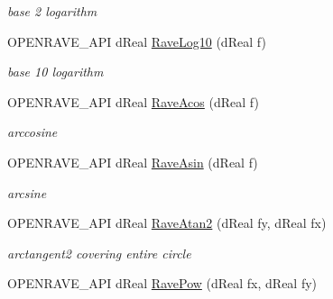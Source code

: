 \begin{DoxyCompactItemize}
\begin{DoxyCompactList}\small\item\em base 2 logarithm \item\end{DoxyCompactList}\item 
\hypertarget{group__affine__math_gab7abc4771e520f8baa20554f4c6d12c2}{
OPENRAVE\_\-API dReal \hyperlink{group__affine__math_gab7abc4771e520f8baa20554f4c6d12c2}{RaveLog10} (dReal f)}
\label{group__affine__math_gab7abc4771e520f8baa20554f4c6d12c2}

\begin{DoxyCompactList}\small\item\em base 10 logarithm \item\end{DoxyCompactList}\item 
\hypertarget{group__affine__math_ga97b4b78434f3e9b0b57cbd9d7b4b6610}{
OPENRAVE\_\-API dReal \hyperlink{group__affine__math_ga97b4b78434f3e9b0b57cbd9d7b4b6610}{RaveAcos} (dReal f)}
\label{group__affine__math_ga97b4b78434f3e9b0b57cbd9d7b4b6610}

\begin{DoxyCompactList}\small\item\em arccosine \item\end{DoxyCompactList}\item 
\hypertarget{group__affine__math_gabae52eb1a8ad7fc3bc90da48a4718941}{
OPENRAVE\_\-API dReal \hyperlink{group__affine__math_gabae52eb1a8ad7fc3bc90da48a4718941}{RaveAsin} (dReal f)}
\label{group__affine__math_gabae52eb1a8ad7fc3bc90da48a4718941}

\begin{DoxyCompactList}\small\item\em arcsine \item\end{DoxyCompactList}\item 
\hypertarget{group__affine__math_ga5099467e8cef4035d8e2ee264c9e312b}{
OPENRAVE\_\-API dReal \hyperlink{group__affine__math_ga5099467e8cef4035d8e2ee264c9e312b}{RaveAtan2} (dReal fy, dReal fx)}
\label{group__affine__math_ga5099467e8cef4035d8e2ee264c9e312b}

\begin{DoxyCompactList}\small\item\em arctangent2 covering entire circle \item\end{DoxyCompactList}\item 
\hypertarget{group__affine__math_ga793937be7953d32b65f2141199cd23d9}{
OPENRAVE\_\-API dReal \hyperlink{group__affine__math_ga793937be7953d32b65f2141199cd23d9}{RavePow} (dReal fx, dReal fy)}
\label{group__affine__math_ga793937be7953d32b65f2141199cd23d9}


\end{DoxyCompactItemize}
